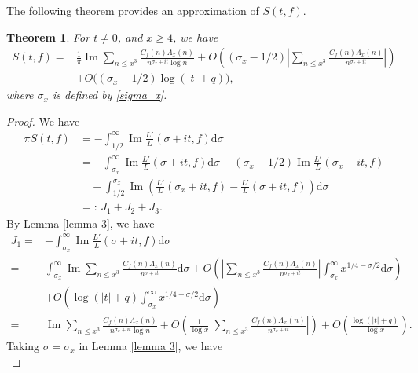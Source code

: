 \documentclass[11pt,reqno]{amsart}
\numberwithin{equation}{section}
\theoremstyle{plain}
\newtheorem{theorem}[lemma]{Theorem}
\theoremstyle{definition}
\renewcommand{\Im}{\operatorname{Im}}
\begin{document}
The following theorem provides an approximation of $S(t,f)$.
\begin{theorem}\label{theorem 1}
For $t\neq 0$, and $x\geq 4$, we have
\begin{equation*}
\begin{split}
S(t,f)=&\frac{1}{\pi}\Im\sum_{n\leq x^3}\frac{C_f(n)\Lambda_x(n)}{n^{\sigma_x+it}\log n}+
O\left((\sigma_x-1/2)\left|\sum_{n\leq x^3} \frac{C_f(n)\Lambda_x(n)}{n^{\sigma_x+it}}\right|\right)\\
&+O\big((\sigma_x-1/2)\log(|t|+q)\big),
\end{split}
\end{equation*}
where $\sigma_x$ is defined by \eqref{sigma_x}.
\end{theorem}
\begin{proof}
We have
\begin{equation*}
\begin{split}
\pi S(t,f)&=-\int_{1/2}^\infty\Im \frac{L'}{L}(\sigma+it,f)\mathrm{d}\sigma\\
&=-\int_{\sigma_x}^\infty\Im \frac{L'}{L}(\sigma+it,f)\mathrm{d}\sigma
-(\sigma_x-1/2)\Im \frac{L'}{L}(\sigma_x+it,f)\\
&\quad+\int_{1/2}^{\sigma_x}\Im\left( \frac{L'}{L}(\sigma_x+it,f)-\frac{L'}{L}(\sigma+it,f)\right)\mathrm{d}\sigma\\
&=:\, J_1+J_2+J_3.
\end{split}
\end{equation*}
By Lemma \ref{lemma 3}, we have
\begin{equation*}
\begin{split}
J_1=&-\int_{\sigma_x}^\infty\Im \frac{L'}{L}(\sigma+it,f)\mathrm{d}\sigma\\
=&\int_{\sigma_x}^\infty\Im\sum_{n\leq x^3} \frac{C_f(n)\Lambda_x(n)}{n^{\sigma+it}}\mathrm{d}\sigma
+O\left(\left|\sum_{n\leq x^3} \frac{C_f(n)\Lambda_x(n)}{n^{\sigma_x+it}}\right|
\int_{\sigma_x}^\infty x^{1/4-\sigma/2}\mathrm{d}\sigma\right)\\
&+O\left(\log(|t|+q)\int_{\sigma_x}^\infty x^{1/4-\sigma/2}\mathrm{d}\sigma\right)\\
=&\Im\sum_{n\leq x^3} \frac{C_f(n)\Lambda_x(n)}{n^{\sigma_x+it}\log n}
+O\left(\frac{1}{\log x}\left|\sum_{n\leq x^3} \frac{C_f(n)\Lambda_x(n)}{n^{\sigma_x+it}}\right|\right)
+O\left(\frac{\log(|t|+q)}{\log x}\right).
\end{split}
\end{equation*}
Taking $\sigma=\sigma_x$ in Lemma \ref{lemma 3}, we have
\begin{equation*}

\end{equation*}
\end{proof}
\end{document}
